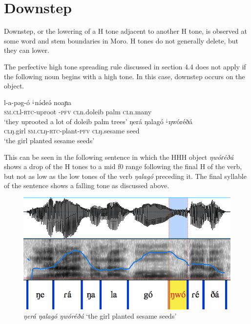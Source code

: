 \section{Downstep}
Downstep, or the lowering of a H tone adjacent to another H tone, is observed at some word and stem boundaries in Moro. H tones do not generally delete, but they can lower.

The perfective high tone spreading rule discussed in section 4.4 does not apply if the following noun begins with a high tone. In this case, downstep occurs on the object.

\ea
\begin{xlist}
	\ex
	\gll	l-a-pəg-ó 	$^{\downarrow}$nə́deə́	 noaɲa\\
		\textsc{sm}.\textsc{cl}l-\textsc{rtc}-uproot -\textsc{pfv}	\textsc{cl}n.doleib palm 	\textsc{cl}n.many\\
	\trans ‘they uprooted a lot of doleib palm trees’
	\ex
	\gll	ŋerá	ŋalagó 		$^{\downarrow}$ŋwóréðá\\		
		\textsc{cl}ŋ.girl	\textsc{sm}.\textsc{cl}ŋ-\textsc{rtc}-plant-\textsc{pfv}	\textsc{cl}ŋ.sesame seed\\	
	\trans ‘the girl planted sesame seeds’
\end{xlist}
\z

This can be seen in the following sentence in which the HHH object \textit{ŋwóɾéðá} shows a drop of the H tones to a mid f0 range following the final H of the verb, but not as low as the low tones of the verb \textit{ŋalagó} preceding it. The final syllable of the sentence shows a falling tone as discussed above.

\begin{figure}
  \includegraphics[width=\linewidth]{figures/fig-ch4-3.png}
  \caption{\textit{ŋerá ŋalagó ŋwóréðá} ‘the girl planted sesame seeds’}
  \label{fig:4-3}
\end{figure}

